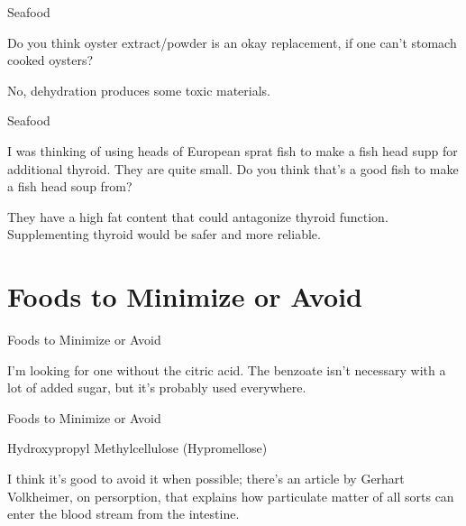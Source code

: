 \documentclass[11pt,oneside,openany,extrafontsizes]{memoir}
\begin{document}
\begin{qaexchange}{Seafood}

    \begin{question}
        Do you think oyster extract/powder is an okay replacement, if one can't stomach cooked oysters?
    \end{question}

    \begin{answer}
      No, dehydration produces some toxic materials.
    \end{answer}
\end{qaexchange}

\begin{qaexchange}{Seafood}

    \begin{question}
        I was thinking of using heads of European sprat fish to make a fish head supp for additional thyroid. They are quite small. Do you think that's a good fish to make a fish head soup from?
    \end{question}

    \begin{answer}
      They have a high fat content that could antagonize thyroid function. Supplementing thyroid would be safer and more reliable.
    \end{answer}
\end{qaexchange}

\section{Foods to Minimize or Avoid}

\begin{standalonequote}{Foods to Minimize or Avoid}

    \begin{answer}
        I'm looking for one without the citric acid. The benzoate isn't necessary with a lot of added sugar, but it's probably used everywhere.
    \end{answer}
\end{standalonequote}

\begin{standalonequote}{Foods to Minimize or Avoid}
    \begin{note}
        Hydroxypropyl Methylcellulose (Hypromellose)
    \end{note}

    \begin{answer}
        I think it's good to avoid it when possible; there's an article by Gerhart Volkheimer, on persorption, that explains how particulate matter of all sorts can enter the blood stream from the intestine.
    \end{answer}
\end{standalonequote}
\end{document}
